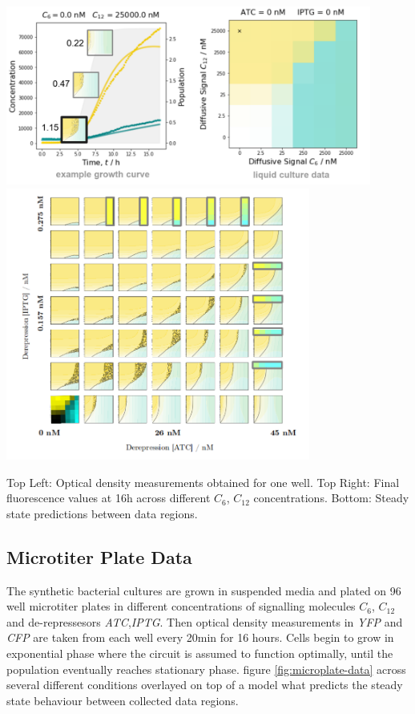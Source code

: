 \begin{Figure}

\includegraphics[width=120mm]{figures/microtiter.png}
\includegraphics[width=100mm]{figures/parameter-space.png}
\caption{Top Left: Optical density measurements obtained for one well.
Top Right: Final fluorescence values at 16h across different $C_6$, $C_{12}$
concentrations. Bottom: Steady state predictions between data regions.}
\label{fig:microplate-data}
\end{Figure}

\subsection{Microtiter Plate Data}
The synthetic bacterial cultures are grown in suspended media and plated on
96 well microtiter plates in different concentrations of signalling molecules
$C_6$, $C_{12}$ and de-repressesors \textit{ATC},\textit{IPTG}. Then
optical density measurements in \textit{YFP} and \textit{CFP} are taken
from each well every 20min for 16 hours. Cells begin to grow in exponential
phase where the circuit is assumed to function optimally, until the
population eventually reaches stationary phase. figure \ref{fig:microplate-data} across
several different conditions overlayed on top of a model what predicts
the steady state behaviour between collected data regions.

